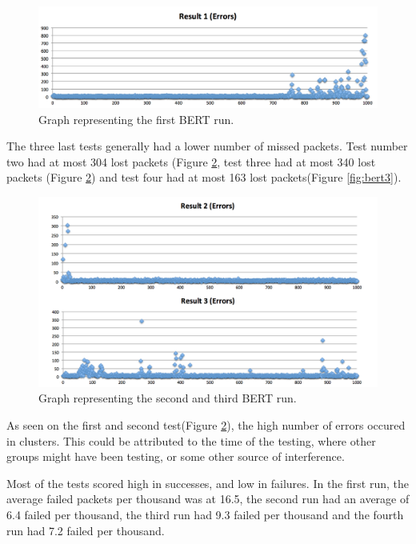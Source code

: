 \begin{figure}[h!]
\hspace*{-2cm}
\includegraphics[width=1.3\textwidth]{chapters/test/figures/res1.png}
\caption{Graph representing the first BERT run.}
\label{fig:bert1}
\end{figure}

The three last tests generally had a lower number of missed packets. Test number two had at most 304 lost packets (Figure \ref{fig:bert2}, test three had at most 340 lost packets (Figure \ref{fig:bert2}) and test four had at most 163 lost packets(Figure \ref{fig:bert3}).

\begin{figure}[h!]
\hspace*{-2cm}
\includegraphics[width=1.3\textwidth]{chapters/test/figures/res5.png}
\caption{Graph representing the second and third BERT run.}
\label{fig:bert2}
\end{figure}

As seen on the first and second test(Figure \ref{fig:bert2}), the high number of errors occured in clusters. This could be attributed to the time of the testing, where other groups might have been testing, or some other source of interference.

Most of the tests scored high in successes, and low in failures. In the first run, the average failed packets per thousand was at 16.5, the second run had an average of 6.4 failed per thousand, the third run had 9.3 failed per thousand and the fourth run had 7.2 failed per thousand.


